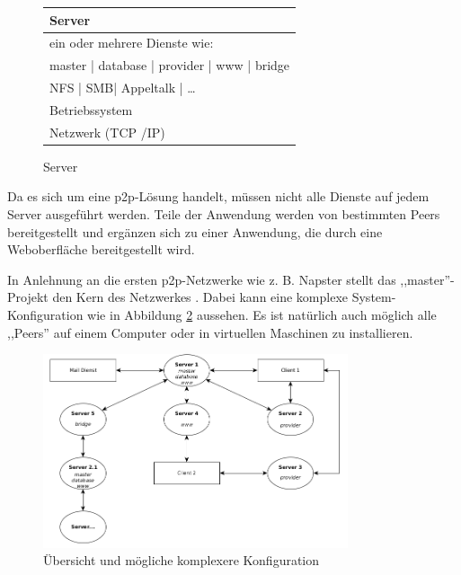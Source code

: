 \documentclass[oneside, ngerman, toc=bibliography,bibliography=totoc,listof=entryprefix, open=right,numbers=noenddot,fontsize=12pt]{scrbook}
\begin{document}
 \begin{figure}[htbp] 
     \centering 
     \begin{tabular}{|p{}|}
         \hline
         Server\\ \hline\hline
         ein oder mehrere Dienste wie:\\
         master  | database | provider | www | bridge\\ \hline\hline
         NFS | SMB| Appeltalk | \ldots \\ \hline
         Betriebssystem \\ \hline
         Netzwerk (TCP /IP) \\ \hline
        \end{tabular}
        
        \caption{Server}
        \label{fig:xist-server}
        
    \end{figure}   
    
 
Da es sich um eine \acrshort{p2p}-Lösung handelt, müssen nicht alle Dienste auf jedem Server ausgeführt werden. 
Teile der Anwendung werden von bestimmten Peers bereitgestellt und ergänzen sich zu einer Anwendung, die durch eine Weboberfläche bereitgestellt wird.


In Anlehnung an die ersten \acrshort{p2p}-Netzwerke wie z. B. Napster stellt das ,,master''-Projekt den Kern des Netzwerkes \cite{mahlmann2007peer}.
Dabei kann eine komplexe System-Konfiguration wie in Abbildung \ref{fig:app-outline} aussehen. Es ist natürlich auch möglich alle ,,Peers'' auf einem Computer oder in virtuellen Maschinen zu installieren.

\begin{figure}[htbp] 
    \centering
    \includegraphics[width=0.8\textwidth]{Masterarbeit_Bilder/clients_uebersicht.png}
    \caption{Übersicht und mögliche komplexere Konfiguration}
    \label{fig:app-outline}
\end{figure}  
\end{document}
